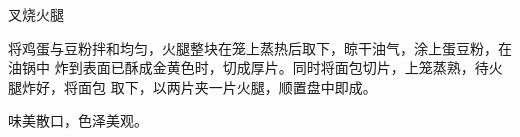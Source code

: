 \begin{recipe}{叉烧火腿}

\ingredients


\preparation

将鸡蛋与豆粉拌和均匀，火腿整块在笼上蒸热后取下，晾干油气，涂上蛋豆粉，在油锅中
炸到表面已酥成金黄色时，切成厚片。同时将面包切片，上笼蒸熟，待火腿炸好，将面包
取下，以两片夹一片火腿，顺置盘中即成。

\features

味美散口，色泽美观。

\end{recipe}

